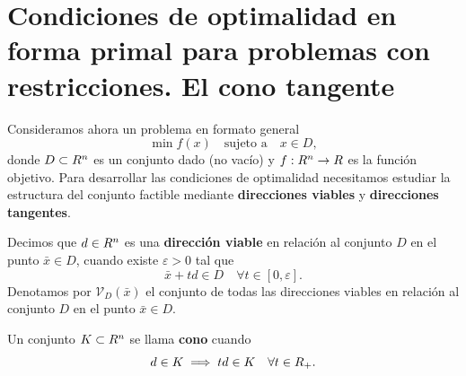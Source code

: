 
\section{Condiciones de optimalidad en forma primal para problemas con restricciones. El cono tangente}
\label{v1:sec:1.4}

Consideramos ahora un problema en formato general
\begin{equation}
 \min f(x) \quad \text{sujeto a} \quad x \in D, \label{v1:eq:1.11}
\end{equation}
donde $D \subset R^n$ es un conjunto dado (no vacío) y $f : R^n \to R$ es la función objetivo. 
Para desarrollar las condiciones de optimalidad necesitamos estudiar la estructura del conjunto factible mediante \textbf{direcciones viables} y \textbf{direcciones tangentes}.

\begin{definition}\label{v1:def:1.4.1}
 Decimos que $d \in R^n$ es una \textbf{dirección viable} en relación al conjunto $D$ en el punto $\bar{x} \in D$, cuando existe $\varepsilon > 0$ tal que
 \[
 \bar{x} + td \in D \quad \forall t \in [0, \varepsilon].
 \]
 Denotamos por $\mathcal{V}_D(\bar{x})$ el conjunto de todas las direcciones viables en relación al conjunto $D$ en el punto $\bar{x} \in D$.
\end{definition}

\begin{center}
\end{center}

\begin{definition}[Cono]\label{v1:def:1.4.2}
 Un conjunto $K \subset R^n$ se llama \textbf{cono} cuando
 \[
 d \in K \implies td \in K \quad \forall t \in R_+.
 \]
\end{definition}

